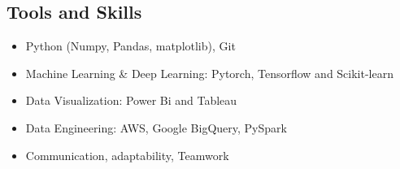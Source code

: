 \begin{tcolorbox}
\begin{minipage}[t]{0.7\textwidth}
\begin{tcolorbox}[grow to right by=0.75cm,height=0.8\textheight,colframe=white,colback=white]
          \section*{Tools and Skills}
          \begin{itemize}
            \item Python (Numpy, Pandas, matplotlib), Git
            \item Machine Learning \& Deep Learning: Pytorch, Tensorflow and Scikit-learn
            \item Data Visualization: Power Bi and Tableau
            \item Data Engineering: AWS, Google BigQuery, PySpark
            \item Communication, adaptability, Teamwork
          \end{itemize}
        \end{tcolorbox}
    \end{minipage}
\end{tcolorbox}


